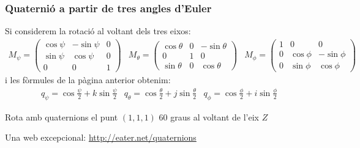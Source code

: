 \documentclass{beamer}
\begin{document}
\begin{frame}
  \frametitle{Quaternió a partir de tres angles d'Euler}
  Si considerem la rotació al voltant dels tres eixos:
  \scriptsize
  \[
   \begin{array}{ccc}
    M_{\psi}=\begin{pmatrix}
                            \cos{\psi}&-\sin{\psi}&0\\
                            \sin{\psi}&\cos{\psi}&0\\
                            0&0&1
             \end{pmatrix}
    &
    M_{\theta}=\begin{pmatrix}
                            \cos{\theta}&0&-\sin{\theta}\\
                            0&1&0\\
                            \sin{\theta}&0&\cos{\theta}
               \end{pmatrix}
    &
    M_{\phi}=\begin{pmatrix}
                            1&0&0\\
                            0&\cos{\phi}&-\sin{\phi}\\
                            0&\sin{\phi}&\cos{\phi}
               \end{pmatrix}
    \end{array}
  \]
  \normalsize
  i les fòrmules de la pàgina anterior obtenim:
  \[
    \begin{array}{ccc}
      q_{\psi}=\cos{\frac{\psi}{2}}+k\sin{\frac{\psi}{2}} &
      q_{\theta}=\cos{\frac{\theta}{2}}+j\sin{\frac{\theta}{2}} &
      q_{\phi}=\cos{\frac{\phi}{2}}+i\sin{\frac{\phi}{2}}
    \end{array}
  \]

  \begin{exercici}{}
    Rota amb quaternions el punt $(1,1,1)$ 60 graus al voltant de l'eix $Z$
  \end{exercici}
  \vspace{\baselineskip}
  Una web excepcional: \url{http://eater.net/quaternions}

\end{frame}
\end{document}
